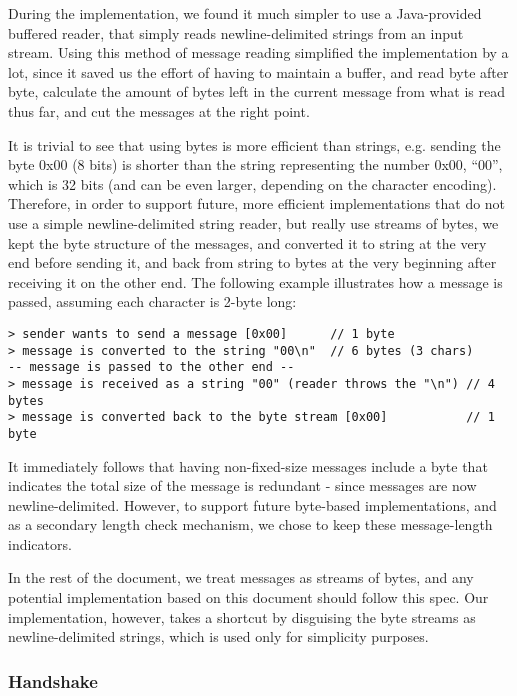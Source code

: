 During the implementation, we found it much simpler to use a Java-provided buffered reader, that simply reads newline-delimited strings from an input stream. Using this method of message reading simplified the implementation by a lot, since it saved us the effort of having to maintain a buffer, and read byte after byte, calculate the amount of bytes left in the current message from what is read thus far, and cut the messages at the right point.

It is trivial to see that using bytes is more efficient than strings, e.g. sending the byte 0x00 (8 bits) is shorter than the string representing the number 0x00, ``00'', which is 32 bits (and can be even larger, depending on the character encoding). Therefore, in order to support future, more efficient implementations that do not use a simple newline-delimited string reader, but really use streams of bytes, we kept the byte structure of the messages, and converted it to string at the very end before sending it, and back from string to bytes at the very beginning after receiving it on the other end. The following example illustrates how a message is passed, assuming each character is 2-byte long:

\begin{verbatim}
> sender wants to send a message [0x00]      // 1 byte
> message is converted to the string "00\n"  // 6 bytes (3 chars)
-- message is passed to the other end --
> message is received as a string "00" (reader throws the "\n") // 4 bytes
> message is converted back to the byte stream [0x00]           // 1 byte
\end{verbatim}

It immediately follows that having non-fixed-size messages include a byte that indicates the total size of the message is redundant - since messages are now newline-delimited. However, to support future byte-based implementations, and as a secondary length check mechanism, we chose to keep these message-length indicators.

In the rest of the document, we treat messages as streams of bytes, and any potential implementation based on this document should follow this spec. Our implementation, however, takes a shortcut by disguising the byte streams as newline-delimited strings, which is used only for simplicity purposes.


\subsubsection{Handshake}
\label{sec:pdus:pdu:hs}

